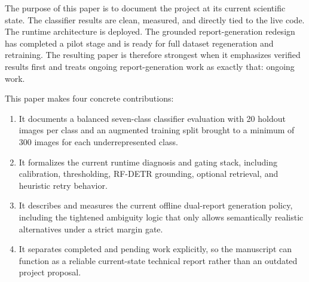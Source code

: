 The purpose of this paper is to document the project at its current scientific state. The classifier results are clean, measured, and directly tied to the live code. The runtime architecture is deployed. The grounded report-generation redesign has completed a pilot stage and is ready for full dataset regeneration and retraining. The resulting paper is therefore strongest when it emphasizes verified results first and treats ongoing report-generation work as exactly that: ongoing work.

This paper makes four concrete contributions:
\begin{enumerate}[leftmargin=1.3em]
\item It documents a balanced seven-class classifier evaluation with 20 holdout images per class and an augmented training split brought to a minimum of 300 images for each underrepresented class.
\item It formalizes the current runtime diagnosis and gating stack, including calibration, thresholding, RF-DETR grounding, optional retrieval, and heuristic retry behavior.
\item It describes and measures the current offline dual-report generation policy, including the tightened ambiguity logic that only allows semantically realistic alternatives under a strict margin gate.
\item It separates completed and pending work explicitly, so the manuscript can function as a reliable current-state technical report rather than an outdated project proposal.
\end{enumerate}
